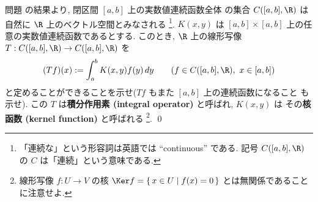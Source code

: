 \documentclass[12pt,twoside]{jarticle}
\begin{document}

\begin{question}[積分作用素, 15点]
  問題  の結果より, 閉区間 $[a,b]$ 上の実数値連続函数全体
  の集合 $C([a,b],\R)$ は自然に $\R$ 上のベクトル空間とみなされる%
  \footnote{「連続な」という形容詞は英語では ``continuous'' である.
    記号 $C([a,b],\R)$ の $C$ は「連続」という意味である.}.
  $K(x,y)$ は $[a,b]\times[a,b]$ 上の任意の実数値連続函数であるとする.
  このとき, $\R$ 上の線形写像 $T:C([a,b],\R)\to C([a,b],\R)$ を
  \begin{equation*}
    (Tf)(x) := \int_a^b K(x,y)f(y)\,dy
    \qquad (f\in C([a,b],\R),\ x\in [a,b])
  \end{equation*}
  と定めることができることを示せ($Tf$ もまた $[a,b]$ 上の連続函数になること
  も示せ).
  この $T$ は{\bf 積分作用素 (integral operator)} と呼ばれ, $K(x,y)$ は
  その{\bf 核函数 (kernel function)} と呼ばれる%
  \footnote{線形写像 $f:U\to V$ の核 $\Ker f = \{\,x\in U\mid f(x)=0\,\}$ 
    とは無関係であることに注意せよ.}.
  \qed
\end{question}
\end{document}
